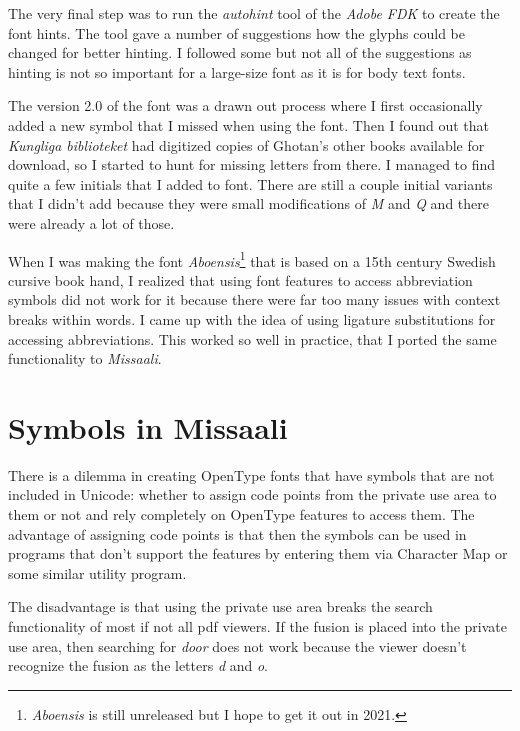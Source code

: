 \documentclass[a4paper, 12pt]{article}
\begin{document}
The very final step was to run the \emph{autohint} tool of the
\emph{Adobe FDK} to create the font hints. The tool gave a number of
suggestions how the glyphs could be changed for better hinting. I
followed some but not all of the suggestions as hinting is not so
important for a large-size font as it is for body text fonts.

The version 2.0 of the font was a drawn out process where I
first occasionally added a new symbol that I missed when using the
font. Then I found out that \emph{Kungliga biblioteket} had digitized
copies of Ghotan's other books available for download, so I started to
hunt for missing letters from there. I managed to find quite a few
initials that I added to font. There are still a couple initial
variants that I didn't add because they were small modifications of
\emph{M} and \emph{Q} and there were already a lot of those. 

When I was making the font \emph{Aboensis}\footnote{\emph{Aboensis} is
  still unreleased but I hope to get it out in 2021.} that is based
on a 15th century Swedish cursive book hand, I realized that using
font features to access abbreviation symbols did not work for it
because there were far too many issues with context breaks within
words. I came up with the idea of using ligature substitutions for
accessing abbreviations. This worked so well in practice, that I
ported the same functionality to \emph{Missaali}.

\section{Symbols in Missaali}

\newcommand{\thd}[1]{\vbox to 4em{\vspace{1em}\hbox{\textbf{#1}}}}

There is a dilemma in creating OpenType fonts that have symbols that
are not included in Unicode: whether to assign code points from the
private use area to them or not and rely completely on OpenType
features to access them. The advantage of assigning code points is
that then the symbols can be used in programs that don't support the
features by entering them via Character Map or some similar utility
program. 

The disadvantage is that using the private use area breaks the search
functionality of most if not all pdf viewers. If the fusion
 is placed into the private use area, then searching for
\emph{door} does not work because the viewer doesn't recognize the
fusion as the letters \emph{d} and \emph{o}.
\end{document}
